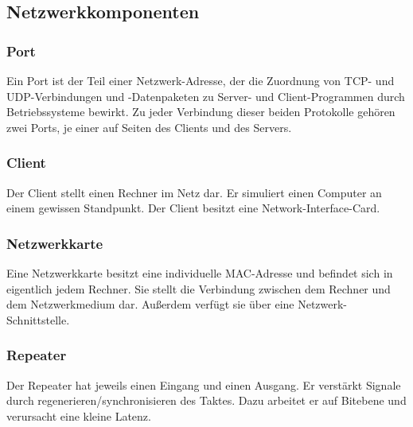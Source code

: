 \documentclass[12pt,a4paper]{article}
\begin{document}
\subsection{Netzwerkkomponenten}

\subsubsection{Port}
    Ein Port ist der Teil einer Netzwerk-Adresse, der die Zuordnung von TCP- und UDP-Verbindungen und -Datenpaketen zu Server- und Client-Programmen durch Betriebssysteme bewirkt. Zu jeder Verbindung dieser beiden Protokolle gehören zwei Ports, je einer auf Seiten des Clients und des Servers.

\subsubsection{Client}
    Der Client stellt einen Rechner im Netz dar. Er simuliert einen Computer an einem gewissen Standpunkt. Der Client besitzt eine Network-Interface-Card.
    \begin{center}
    \end{center}

\subsubsection{Netzwerkkarte}
    Eine Netzwerkkarte besitzt eine individuelle MAC-Adresse und befindet sich in eigentlich jedem Rechner. Sie stellt die Verbindung zwischen dem Rechner und dem Netzwerkmedium dar. Außerdem verfügt sie über eine Netzwerk-Schnittstelle.

\subsubsection{Repeater}
    Der Repeater hat jeweils einen Eingang und einen Ausgang. Er verstärkt Signale durch regenerieren/synchronisieren des Taktes. Dazu arbeitet er auf Bitebene und verursacht eine kleine Latenz.
        \begin{center}
        \end{center}
\end{document}
